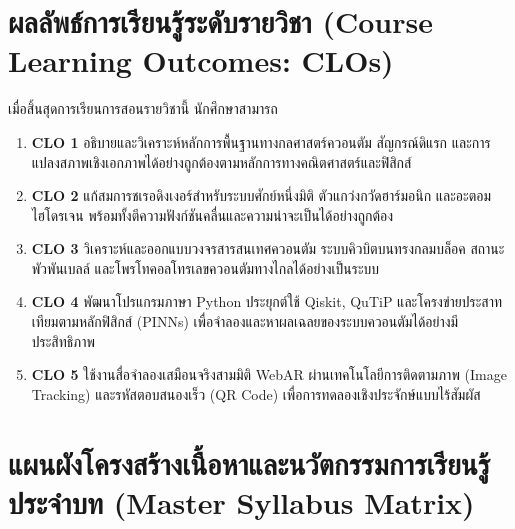 \section*{ผลลัพธ์การเรียนรู้ระดับรายวิชา (Course Learning Outcomes: CLOs)}
เมื่อสิ้นสุดการเรียนการสอนรายวิชานี้ นักศึกษาสามารถ
\begin{enumerate}[leftmargin=1.5cm]
    \item \textbf{CLO 1} อธิบายและวิเคราะห์หลักการพื้นฐานทางกลศาสตร์ควอนตัม สัญกรณ์ดิแรก และการแปลงสภาพเชิงเอกภาพได้อย่างถูกต้องตามหลักการทางคณิตศาสตร์และฟิสิกส์
    \item \textbf{CLO 2} แก้สมการชเรอดิงเงอร์สำหรับระบบศักย์หนึ่งมิติ ตัวแกว่งกวัดฮาร์มอนิก และอะตอมไฮโดรเจน พร้อมทั้งตีความฟังก์ชันคลื่นและความน่าจะเป็นได้อย่างถูกต้อง
    \item \textbf{CLO 3} วิเคราะห์และออกแบบวงจรสารสนเทศควอนตัม ระบบคิวบิตบนทรงกลมบล็อค สถานะพัวพันเบลล์ และโพรโทคอลโทรเลขควอนตัมทางไกลได้อย่างเป็นระบบ
    \item \textbf{CLO 4} พัฒนาโปรแกรมภาษา Python ประยุกต์ใช้ Qiskit, QuTiP และโครงข่ายประสาทเทียมตามหลักฟิสิกส์ (PINNs) เพื่อจำลองและหาผลเฉลยของระบบควอนตัมได้อย่างมีประสิทธิภาพ
    \item \textbf{CLO 5} ใช้งานสื่อจำลองเสมือนจริงสามมิติ WebAR ผ่านเทคโนโลยีการติดตามภาพ (Image Tracking) และรหัสตอบสนองเร็ว (QR Code) เพื่อการทดลองเชิงประจักษ์แบบไร้สัมผัส
\end{enumerate}

\newpage
\section*{แผนผังโครงสร้างเนื้อหาและนวัตกรรมการเรียนรู้ประจำบท (Master Syllabus Matrix)}

